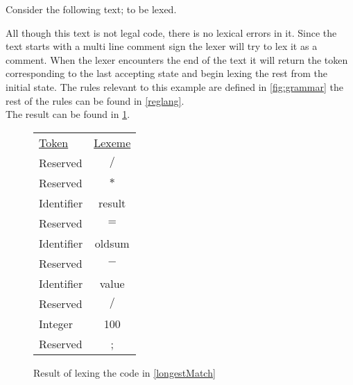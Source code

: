 \begin{example} \label{longestMatch}
Consider the following text; to be lexed.

All though this text is not legal code, there is no lexical errors in it. Since
the text starts with a multi line comment sign the lexer will try to lex it as
a comment. When the lexer encounters the end of the text it will return the
token corresponding to the last accepting state and begin lexing the rest from
the initial state. The rules relevant to this example are defined in 
\cref{fig:grammar} the rest of the rules can be found in \cref{reglang}.\\
The result can be found in \cref{fig:longestmatch}.
\end{example}

\begin{figure}[h!]
\begin{center}
\begin{tabular}{l c}
\underline{Token} & \underline{Lexeme}\\
Reserved & $/$\\
Reserved & $*$\\
Identifier & result\\
Reserved & $=$\\
Identifier & oldsum\\
Reserved & $-$\\
Identifier & value\\
Reserved & $/$\\
Integer & 100\\
Reserved & ;
\end{tabular}
\end{center}
\caption{Result of lexing the code in \cref{longestMatch} \label{fig:longestmatch}}
\end{figure}


